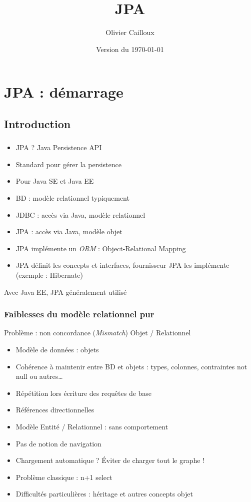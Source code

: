 \documentclass[french, english]{beamer}
\title{JPA}
\author{Olivier Cailloux}
\institute[LAMSADE]{LAMSADE, Université Paris-Dauphine}
\date{Version du \today}
\begin{document}


\begin{frame}[plain]
   \titlepage
\end{frame}
\addtocounter{framenumber}{-1}

\section{JPA : démarrage}
\subsection{Introduction}
\begin{frame}
	\frametitle{\subsecname}
	\begin{itemize}
		\item JPA ? \pause Java Persistence API
		\item Standard pour gérer la persistence
		\item Pour Java SE et Java EE
		\item BD : modèle relationnel {\tiny typiquement}
		\item JDBC : accès via Java, modèle relationnel
		\item JPA : accès via Java, modèle objet
		\item JPA implémente un \emph{ORM} : Object-Relational Mapping
		\item JPA définit les concepts et interfaces, fournisseur JPA les implémente (exemple : Hibernate)
	\end{itemize}
	 Avec Java EE, JPA généralement utilisé
\end{frame}

\begin{frame}
	\frametitle{Faiblesses du modèle relationnel pur}
	Problème : non concordance (\emph{Mismatch}) Objet / Relationnel
	\begin{itemize}
		\item Modèle de données : objets
		\item Cohérence à maintenir entre BD et objets : types, colonnes, contraintes not null ou autres…
		\item Répétition lors écriture des requêtes de base
		\item Références directionnelles
		\item Modèle Entité / Relationnel : sans comportement
		\item Pas de notion de navigation
		\item Chargement automatique ? \pause Éviter de charger tout le graphe !\pause
		\item Problème classique : n+1 select
		\item Difficultés particulières : héritage et autres concepts objet
	\end{itemize}
\end{frame}
\end{document}
